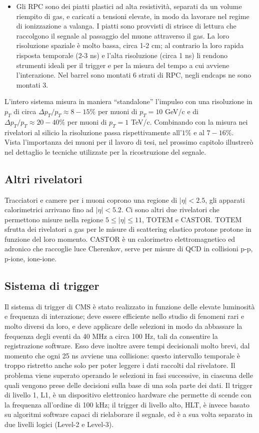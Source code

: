 \begin{itemize}
\item Gli RPC sono dei piatti plastici ad alta resistivit\`a, separati da un volume riempito di gas, e caricati a tensioni elevate, in modo da lavorare nel regime di ionizzazione a valanga. I piatti sono provvisti di strisce di lettura che raccolgono il segnale al passaggio del muone attraverso il gas. La loro risoluzione spaziale \`e molto bassa, circa 1-2 cm; al contrario la loro rapida risposta temporale (2-3 ns) e l'alta risoluzione (circa 1 ns) li rendono strumenti ideali per il trigger e per la misura del tempo a cui avviene l'interazione. Nel barrel sono montati 6 strati di RPC, negli endcaps ne sono montati 3.\\
\end{itemize}
L'intero sistema misura in maniera ``standalone'' l'impulso con una risoluzione in $p_T$ di circa $\Delta p_T/p_T \approx 8-15\%$ per muoni di $p_T = 10$ GeV/c e di $\Delta p_T/p_T \approx 20-40\%$ per muoni di $p_T = 1$ TeV/c. Combinando con la misura nei rivelatori al silicio la risoluzione passa rispettivamente all'$1\%$ e al $7-16\%$.\\
Vista l'importanza dei muoni per il lavoro di tesi, nel prossimo capitolo illustrer\`o nel dettaglio le tecniche utilizzate per la ricostruzione del segnale.
\subsection{Altri rivelatori}
Tracciatori e camere per i muoni coprono una regione di $|\eta|<2.5$, gli apparati calorimetrici arrivano fino ad $|\eta|<5.2$. Ci sono altri due rivelatori che permettono misure nella regione $5 \leq |\eta| \leq 11$, TOTEM e CASTOR. TOTEM sfrutta dei rivelatori a gas per le misure di scattering elastico protone protone in funzione del loro momento. CASTOR \`e un calorimetro elettromagnetico ed adronico che raccoglie luce Cherenkov, serve per misure di QCD in collisioni p-p, p-ione, ione-ione.
\subsection{Sistema di trigger}
Il sistema di trigger di CMS \`e stato realizzato in funzione delle elevate luminosit\`a e frequenza di interazione; deve essere efficiente nello studio di fenomeni rari e molto diversi da loro, e deve applicare delle selezioni in modo da abbassare la frequenza degli eventi da 40 MHz a circa 100 Hz, tali da consentire la registrazione software. Esso deve inoltre avere tempi decisionali molto brevi, dal momento che ogni 25 ns avviene una collisione: questo intervallo temporale \`e troppo ristretto anche solo per poter leggere i dati raccolti dal rivelatore. Il problema viene superato operando le selezioni in fasi successive, in ciascuna delle quali vengono prese delle decisioni sulla base di una sola parte dei dati. Il trigger di livello 1, L1, \`e un dispositivo elettronico hardware che permette di scende con la frequenza all'ordine di 100 kHz; il trigger di livello alto, HLT, \`e invece basato su algoritmi software capaci di rielaborare il segnale, ed \`e a sua volta separato in due livelli logici (Level-2 e Level-3).\\

